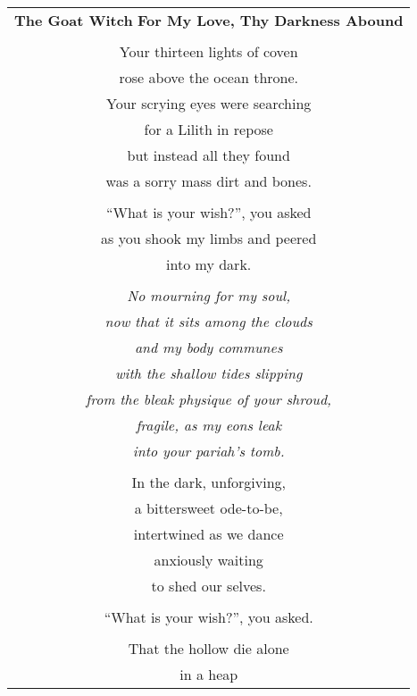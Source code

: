 \documentclass{article}
\begin{document}
\begin{center}
\begin{tabular}{c}
\textbf{The Goat Witch}
{\footnotesize\textbf{For My Love, Thy Darkness Abound}} \\
\\
Your thirteen lights of coven \\
rose above the ocean throne. \\
Your scrying eyes were searching \\
for a Lilith in repose \\
but instead all they found \\
was a sorry mass dirt and bones. \\
\\
``What is your wish?'', you asked \\
as you shook my limbs and peered \\
into my dark. \\
\\
\textit{No mourning for my soul,} \\
\textit{now that it sits among the clouds} \\
\textit{and my body communes} \\
\textit{with the shallow tides slipping}\\
\textit{from the bleak physique of your shroud,} \\
\textit{fragile, as my eons leak} \\
\textit{into your pariah's tomb.} \\
\\
%
In the dark, unforgiving, \\
a bittersweet ode-to-be, \\
intertwined as we dance \\
anxiously waiting \\
to shed our selves. \\
\\
``What is your wish?'', you asked. \\
\\
That the hollow die alone \\
in a heap \\

\end{tabular}
\end{center}
\end{document}
